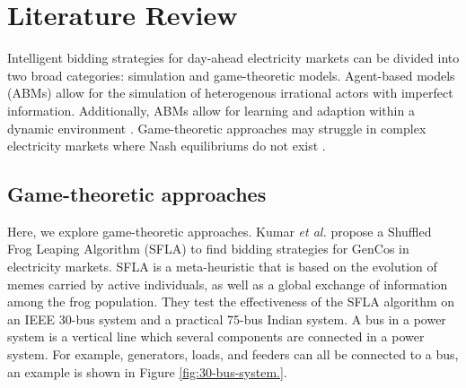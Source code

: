 









\section{Literature Review}
\label{rl:sec:lit-review}

Intelligent bidding strategies for day-ahead electricity markets can be divided into two broad categories: simulation and game-theoretic models. Agent-based models (ABMs) allow for the simulation of heterogenous irrational actors with imperfect information. Additionally, ABMs allow for learning and adaption within a dynamic environment \cite{EsmaeiliAliabadi2017}. Game-theoretic approaches may struggle in complex electricity markets where Nash equilibriums do not exist \cite{Wang2011}.

\subsection{Game-theoretic approaches}

Here, we explore game-theoretic approaches. Kumar \textit{et al.} \cite{VijayaKumar2014} propose a Shuffled Frog Leaping Algorithm (SFLA) to find bidding strategies for GenCos in electricity markets. SFLA is a meta-heuristic that is based on the evolution of memes carried by active individuals, as well as a global exchange of information among the frog population. They test the effectiveness of the SFLA algorithm on an IEEE 30-bus system and a practical 75-bus Indian system. A bus in a power system is a vertical line which several components are connected in a power system. For example, generators, loads, and feeders can all be connected to a bus, an example is shown in Figure \ref{fig:30-bus-system.}. 

